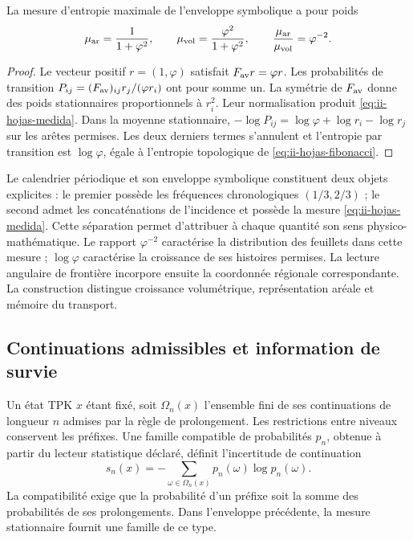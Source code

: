 \begin{proposition}
La mesure d'entropie maximale de l'enveloppe symbolique a pour poids
\begin{equation}
 \mu_{\rm ar}=\frac{1}{1+\varphi^2},\qquad
 \mu_{\rm vol}=\frac{\varphi^2}{1+\varphi^2},\qquad
 \frac{\mu_{\rm ar}}{\mu_{\rm vol}}=\varphi^{-2}.
 \label{eq:ii-hojas-medida}
\end{equation}
\end{proposition}
\begin{proof}
Le vecteur positif \(r=(1,\varphi)\) satisfait
\(F_{\rm av}r=\varphi r\). Les probabilités de transition
\(P_{ij}=(F_{\rm av})_{ij}r_j/(\varphi r_i)\) ont pour somme un.
La symétrie de \(F_{\rm av}\) donne des poids stationnaires proportionnels
à \(r_i^2\). Leur normalisation produit
\eqref{eq:ii-hojas-medida}. Dans la moyenne stationnaire,
\(-\log P_{ij}=\log\varphi+\log r_i-\log r_j\) sur les
arêtes permises. Les deux derniers termes s'annulent et
l'entropie par transition est \(\log\varphi\), égale à l'entropie
topologique de \eqref{eq:ii-hojas-fibonacci}.
\end{proof}

Le calendrier périodique et son enveloppe symbolique constituent deux
objets explicites : le premier possède les fréquences chronologiques
\((1/3,2/3)\) ; le second admet les concaténations de l’incidence
et possède la mesure \eqref{eq:ii-hojas-medida}. Cette séparation permet
d’attribuer à chaque quantité son sens physico-mathématique. Le rapport
\(\varphi^{-2}\) caractérise la distribution des feuillets dans cette
mesure ; \(\log\varphi\) caractérise la croissance de ses histoires
permises. La lecture angulaire de frontière incorpore ensuite la
coordonnée régionale correspondante. La construction distingue
croissance volumétrique, représentation aréale et mémoire du transport.

\subsection{Continuations admissibles et information de survie}
\label{sec:ii-informacion-supervivencia}

Un état TPK \(x\) étant fixé, soit \(\Omega_n(x)\) l’ensemble fini
de ses continuations de longueur \(n\) admises par la règle de
prolongement. Les restrictions entre niveaux conservent les préfixes.
Une famille compatible de probabilités \(p_n\), obtenue à partir du
lecteur statistique déclaré, définit l’incertitude de
continuation
\begin{equation}
 s_n(x)=-\sum_{\omega\in\Omega_n(x)}
                 p_n(\omega)\log p_n(\omega).
 \label{eq:ii-entropia-continuaciones}
\end{equation}
La compatibilité exige que la probabilité d’un préfixe soit la somme
des probabilités de ses prolongements. Dans l’enveloppe précédente,
la mesure stationnaire fournit une famille de ce type.

